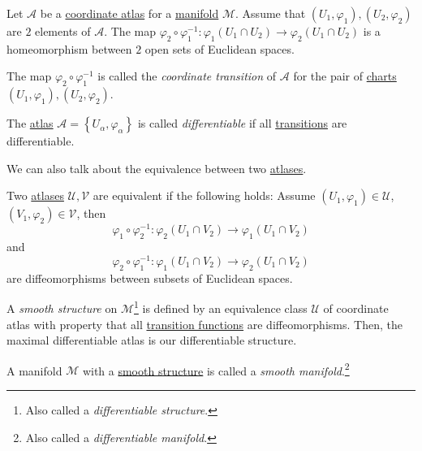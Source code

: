 \begin{definition}\label{def:smooth-manifold}
	Let \(\mathcal{A} \) be a \hyperref[def:atlas]{coordinate atlas} for a \hyperref[def:topological-manifold]{manifold} \(\mathcal{M} \). Assume that \((U_1, \varphi _1), (U_2, \varphi _2)\) are \(2\) elements of \(\mathcal{A} \). The map \(\varphi _2 \circ \varphi _1 ^{-1} \colon \varphi _1(U_1 \cap U_2) \to \varphi _2(U_1 \cap U_2)\) is a homeomorphism between \(2\) open sets of Euclidean spaces.

	\begin{definition}\label{def:coordinate-transition}
		The map \(\varphi _2 \circ \varphi _1 ^{-1} \) is called the \emph{coordinate transition} of \(\mathcal{A} \) for the pair of \hyperref[def:coordinate-chart]{charts} \((U_1, \varphi _1), (U_2, \varphi _2)\).
	\end{definition}

	The \hyperref[def:atlas]{atlas} \(\mathcal{A} = \left\{ U_\alpha , \varphi _\alpha  \right\} \) is called \emph{differentiable} if all \hyperref[def:coordinate-transition]{transitions} are differentiable.

	We can also talk about the equivalence between two \hyperref[def:atlas]{atlases}.

	\begin{definition}[Equivalence]\label{def:equivalence}
		Two  \hyperref[def:atlas]{atlases} \(\mathcal{U} , \mathcal{V} \) are equivalent if the following holds: Assume \((U_1, \varphi _1)\in \mathcal{U} \), \((V_1, \varphi _2)\in \mathcal{V} \), then
		\[
			\varphi _1 \circ \varphi _2 ^{-1} \colon \varphi _2(U_1 \cap V_2) \to \varphi _1(U_1 \cap V_2)
		\]
		and
		\[
			\varphi _2 \circ \varphi _1 ^{-1} \colon \varphi _1(U_1 \cap V_2) \to \varphi _2(U_1 \cap V_2)
		\]
		are diffeomorphisms between subsets of Euclidean spaces.
	\end{definition}

	\begin{definition}\label{def:smooth-structure}
		A \emph{smooth structure} on \(\mathcal{M} \)\footnote{Also called a \emph{differentiable structure}.} is defined by an equivalence class \(\mathcal{U} \) of coordinate atlas with property that all \hyperref[def:coordinate-transition]{transition functions} are diffeomorphisms. Then, the maximal differentiable atlas is our differentiable structure.
	\end{definition}

	A manifold \(\mathcal{M} \) with a \hyperref[def:smooth-structure]{smooth structure} is called a \emph{smooth manifold}.\footnote{Also called a \emph{differentiable manifold}.}
\end{definition}

